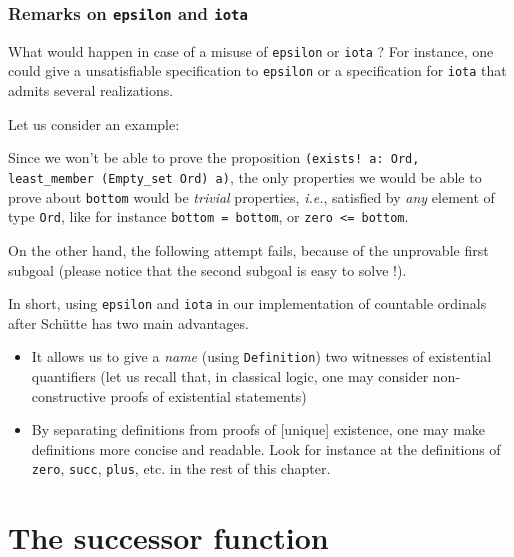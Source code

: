


\subsubsection{Remarks on \texttt{epsilon} and \texttt{iota}}

 What would happen in case of a misuse of \texttt{epsilon} or \texttt{iota} ?
For instance, one could give a unsatisfiable specification to \texttt{epsilon} or 
a specification for \texttt{iota} that admits several realizations.

Let us consider an example:



Since we won't be able to prove the proposition
\linebreak \Verb|(exists! a: Ord, least_member (Empty_set Ord) a)|, the only properties we would be able to prove about \texttt{bottom} would be \emph{trivial} properties, 
\emph{i.e.}, satisfied by \emph{any} element of type \texttt{Ord}, like for instance
\texttt{bottom = bottom}, or \texttt{zero <= bottom}.



On the other hand, the following attempt fails, because of the unprovable first subgoal (please notice that the second subgoal is easy to solve !).




In short, using \texttt{epsilon} and \texttt{iota} in our implementation of countable ordinals after Schütte has two main advantages.


\begin{itemize}
\item It allows us to give a \emph{name} (using \texttt{Definition}) two witnesses 
of existential quantifiers (let us recall that, in classical logic, one may consider non-constructive proofs of existential statements)
\item By separating definitions from proofs of [unique] existence, one may make definitions  more concise and readable. Look for instance at 
the definitions of  \texttt{zero}, \texttt{succ}, \texttt{plus}, etc. in the rest of this chapter.
\end{itemize}

\section{The  successor function}

